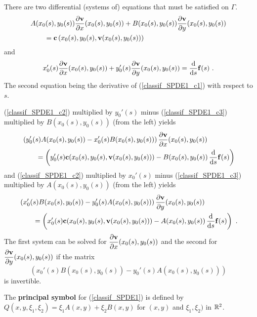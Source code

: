 There are two differential (systems of) equations that must be
satisfied on $\Gamma$.
\begin{equation} \label{classif_SPDE1_c2}
\begin{split}
&A(x_0(s),y_0(s)) \pdydx{\VEC{v}}{x}(x_0(s),y_0(s)) + B(x_0(s),y_0(s))
\pdydx{\VEC{v}}{y}(x_0(s),y_0(s)) \\
&\qquad =\VEC{c}\left(x_0(s),y_0(s),\VEC{v}(x_0(s),y_0(s))\right)
\end{split}
\end{equation}
and
\begin{equation} \label{classif_SPDE1_c3}
x_0'(s)\pdydx{\VEC{v}}{x}(x_0(s),y_0(s)) +
y_0'(s)\pdydx{\VEC{v}}{y}(x_0(s),y_0(s)) = \dfdx{\VEC{f}}{s}(s) \ .
\end{equation}
The second equation being the derivative of (\ref{classif_SPDE1_c1})
with respect to $s$.

(\ref{classif_SPDE1_c2}) multiplied by $y_0'(s)$ minus
(\ref{classif_SPDE1_c3}) multiplied by $B(x_0(s),y_0(s))$ (from the
left) yields
\begin{align*}
& \left( y_0'(s)A(x_0(s),y_0(s)) - x_0'(s)B(x_0(s),y_0(s)) \right)
\pdydx{\VEC{v}}{x}(x_0(s),y_0(s)) \\
&\qquad = \left( y_0'(s) \VEC{c}(x_0(s),y_0(s),\VEC{v}(x_0(s),y_0(s)))
- B(x_0(s),y_0(s))\,\dfdx{\VEC{f}}{s}(s)\right)
\end{align*}
and (\ref{classif_SPDE1_c2}) multiplied by $x_0'(s)$ minus
(\ref{classif_SPDE1_c3}) multiplied by $A(x_0(s),y_0(s))$ (from the
left) yields
\begin{align*}
&\left( x_0'(s)B(x_0(s),y_0(s)) - y_0'(s)A(x_0(s),y_0(s)) \right)
\pdydx{\VEC{v}}{y}(x_0(s),y_0(s)) \\
&\qquad = \left( x_0'(s) \VEC{c}(x_0(s),y_0(s),\VEC{v}(x_0(s),y_0(s)))
- A(x_0(s),y_0(s))\,\dfdx{\VEC{f}}{s}(s)\right) \ .
\end{align*}
The first system can be solved for
$\displaystyle \pdydx{\VEC{v}}{x}(x_0(s),y_0(s))$ and the second for
$\displaystyle \pdydx{\VEC{v}}{y}(x_0(s),y_0(s))$ if the matrix
\begin{equation} \label{classif_SPDE1_c4}
\left( x_0'(s)B(x_0(s),y_0(s)) - y_0'(s)A(x_0(s),y_0(s)) \right)
\end{equation}
is invertible.

\begin{defn}
The {\bfseries principal symbol} for
(\ref{classif_SPDE1}) is defined by
$\displaystyle
Q\left(x,y,\xi_1, \xi_2\right) = \xi_1 A(x,y) + \xi_2 B(x,y)$
for $(x,y)$ and $\xi_1,\xi_2)$ in $\RR^2$.
\end{defn}

